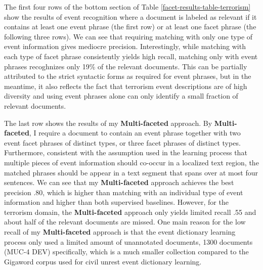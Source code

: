 The first four rows of the bottom section of 
Table \ref{facet-results-table-terrorism} show the results of event recognition 
where 
a document is labeled as relevant if it contains at least 
one event phrase (the first row) or at least one facet phrase 
(the following three rows). 
We can see that requiring matching with only one type of event information 
gives mediocre precision. 
Interestingly, while matching with each type of facet phrase 
consistently yields high recall, matching only with event phrases 
recoghnizes only 19\% of the relevant documents. 
This can be partially attributed to the strict syntactic forms 
as required  for event phrases, but in the meantime, it 
also reflects the fact that terrorism event descriptions are of high diversity and 
using event phrases alone can only identify 
a small fraction of relevant documents.

The last row shows the results of my {\bf Multi-faceted} approach. 
By {\bf Multi-faceted}, I require a document to contain 
an event phrase together with two event facet phrases of distinct types, 
or three facet phrases of distinct types. 
Furthermore, consistent with the assumption used in the learning process 
that multiple pieces of event information should co-occur 
in a localized text region, 
the matched phrases should be appear in a text segment that spans over  
at most four sentences.
We can see that my {\bf Multi-faceted} approach achieves the best 
precision .80, which is higher than matching with an individual type of 
event information and higher than both supervised baselines.
However, for the terrorism domain, the {\bf Multi-faceted} approach 
only yields limited recall .55 and about half of the relevant documents 
are missed. One main reason for the low recall of 
my {\bf Multi-faceted} approach is 
that the event dictionary learning process only used a limited 
amount of unannotated documents, 1300 documents (MUC-4 DEV) specifically, 
which is a much smaller collection compared to the 
Gigaword corpus used for civil unrest event dictionary learning. 




